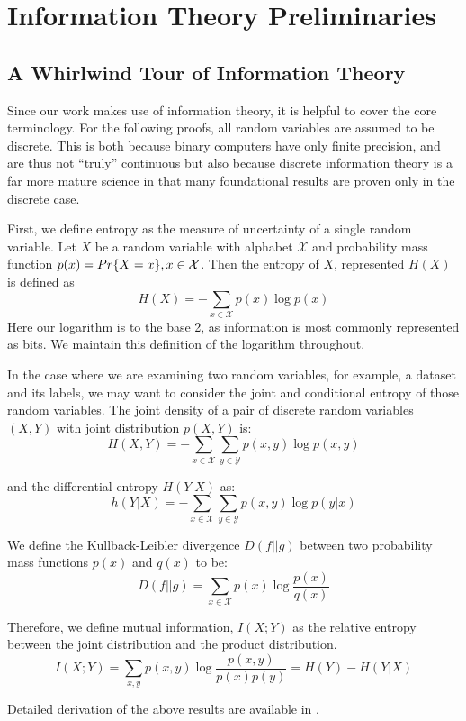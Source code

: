 \chapter{Information Theory Preliminaries}
\label{chap:two}

\section{A Whirlwind Tour of Information Theory} 
Since our work makes use of information theory, it is helpful to cover the core terminology.
For the following proofs, all random variables are assumed to be discrete. 
This is both because binary computers have only finite precision, and are thus not ``truly'' continuous but also because discrete information theory is a far more mature science in that many foundational results are proven only in the discrete case.

First, we define entropy as the measure of uncertainty of a single random variable.
Let $X$ be a random variable with alphabet $\mathcal{X}$ and probability mass function $p(x) = \\Pr\{X = x\}, x \in \mathcal{X}$.
Then the entropy of $X$, represented $H(X)$ is defined as
$$H(X) = -\sum_{x \in \mathcal{X}} p(x) \log{p(x)}$$
Here our logarithm is to the base 2, as information is most commonly represented as bits.
We maintain this definition of the logarithm throughout. 

In the case where we are examining two random variables, for example, a dataset and its labels, we may want to consider the joint and conditional entropy of those random variables.
The joint density of a pair of discrete random variables $(X, Y)$ with joint distribution $p(X, Y)$ is:
$$H(X, Y) = - \sum_{x \in \mathcal{X}} \sum_{y \in \mathcal{Y}} p(x, y) \log{p(x, y)}$$

and the differential entropy $H(Y | X)$ as:
$$ h(Y|X) = -\sum_{x \in \mathcal{X}} \sum_{y \in \mathcal{Y}} p(x, y) \log{p(y|x)}$$

We define the Kullback-Leibler divergence $D(f||g)$ between two probability mass functions $p(x)$ and $q(x)$ to be:
$$D(f||g) = \sum_{x \in \mathcal{X}} p(x) \log{\frac{p(x)}{q(x)}}$$

Therefore, we define mutual information, $I(X; Y)$ as the relative entropy between the joint distribution and the product distribution.
$$I(X; Y) = \sum_{x, y} p(x, y) \log{\frac{p(x,y)}{p(x) p(y)}} = H(Y) - H(Y|X)$$

Detailed derivation of the above results are available in \cite{coverthomas2006}.

